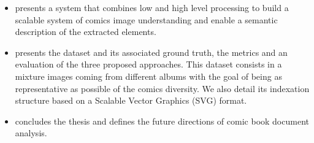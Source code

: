 \begin{itemize}



\item {} presents a system that combines low and high level processing to build a scalable system of comics image understanding and enable a semantic description of the extracted elements.


\item {} presents the dataset and its associated ground truth, the metrics and an evaluation of the three proposed approaches.
This dataset consists in a mixture images coming from different albums with the goal of being as representative as possible of the comics diversity.
We also detail its indexation structure based on a Scalable Vector Graphics (SVG) format.

\item {} concludes the thesis and defines the future directions of comic book document analysis.

\end{itemize}


